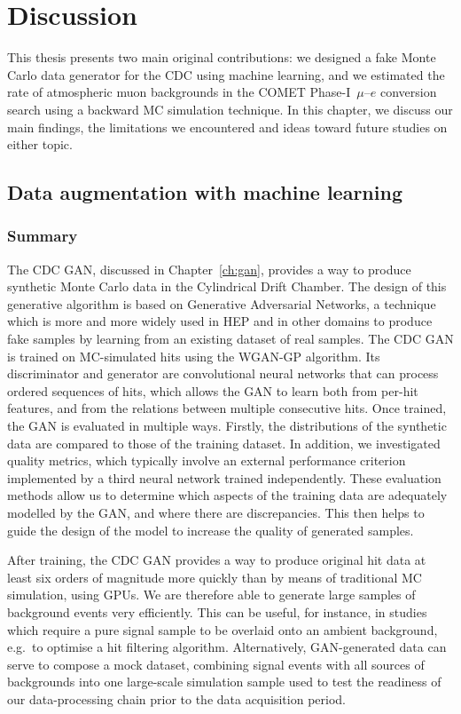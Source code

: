 \chapter{Discussion}
\label{ch:discussion}

This thesis presents two main original contributions: we designed a fake Monte
Carlo data generator for the CDC using machine learning, and we estimated the rate of
atmospheric muon backgrounds in the COMET Phase\nobreakdash-I $\,\mu$--$e$ conversion search
using a backward MC simulation technique. In this chapter, we discuss our main
findings, the limitations we encountered and ideas toward future studies on
either topic.

\section{Data augmentation with machine learning}

\subsection{Summary}
The CDC GAN, discussed in Chapter~\ref{ch:gan}, provides a way to produce
synthetic Monte Carlo data in the Cylindrical Drift Chamber. The design of this
generative algorithm is based on Generative Adversarial Networks, a technique
which is more and more widely used in HEP and in other domains to produce fake
samples by learning from an existing dataset of real samples. The CDC GAN is
trained on MC-simulated hits using the WGAN-GP algorithm. Its discriminator and
generator are convolutional neural networks that can process ordered sequences
of hits, which allows the GAN to learn both from per-hit features, and from the
relations between multiple consecutive hits. Once trained, the GAN is evaluated
in multiple ways. Firstly, the distributions of the synthetic data are compared
to those of the training dataset. In addition, we investigated quality metrics,
which typically involve an external performance criterion implemented by a third
neural network trained independently. These evaluation methods allow us to
determine which aspects of the training data are adequately modelled by the GAN,
and where there are discrepancies. This then helps to guide the design of the
model to increase the quality of generated samples.

After training, the CDC GAN provides a way to produce original hit data at least
six orders of magnitude more quickly than by means of traditional MC simulation,
using GPUs. We are therefore able to generate large samples of background events
very efficiently. This can be useful, for instance, in studies which require a
pure signal sample to be overlaid onto an ambient background, e.g.\ to optimise
a hit filtering algorithm. Alternatively, GAN-generated data can serve to
compose a mock dataset, combining signal events with all sources of backgrounds
into one large-scale simulation sample used to test the readiness of our
data-processing chain prior to the data acquisition period.




